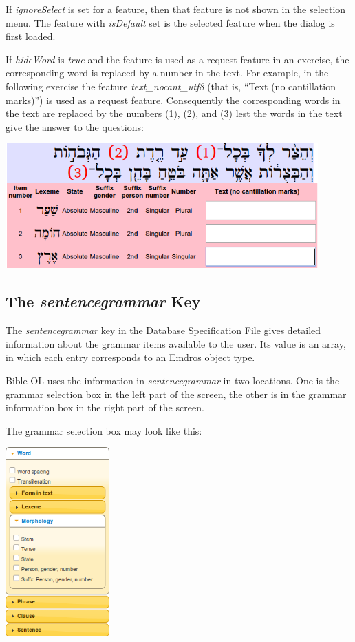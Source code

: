 \documentclass[11pt,oneside,a4paper]{memoir}
\begin{document}
If \emph{ignoreSelect} is set for a feature, then that feature is not shown in the selection menu.
The feature with \emph{isDefault} set is the selected feature when the dialog is first loaded.

If \emph{hideWord} is \emph{true} and the feature is used as a request feature in an exercise, the
corresponding word is replaced by a number in the text. For example, in the following exercise the
feature \emph{text\_nocant\_utf8} (that is, ``Text (no cantillation marks)'') is used as a request
feature. Consequently the corresponding words in the text are replaced by the numbers (1), (2), and
(3) lest the words in the text give the answer to the questions:


\begin{center}
  \includegraphics[width=0.9\textwidth]{numbers.png}
\end{center}

\subsection{The \emph{sentencegrammar} Key}\label{sentencegrammar}

The \emph{sentencegrammar} key in the Database Specification File gives detailed information about
the grammar items available to the user. Its value is an array, in which each entry
corresponds to an Emdros object type.

Bible OL uses the information in \emph{sentencegrammar} in two locations. One is the grammar
selection box in the left part of the screen, the other is in the grammar information box in the
right part of the screen.

The grammar selection box may look like this:

\begin{center}
  \includegraphics[width=0.3\textwidth]{grammarselect.png}\label{grammarselect}
\end{center}
\end{document}
